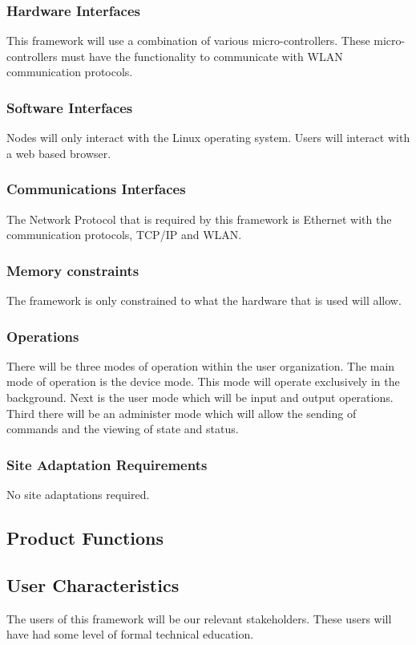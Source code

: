 \documentclass[draftclsnofoot, onecolumn, compsoc, 10pt]{IEEEtran}
\begin{document}
\subsubsection{Hardware Interfaces}
This framework will use a combination of various micro-controllers. These micro-controllers must have the functionality to communicate with WLAN communication protocols.

\subsubsection{Software Interfaces}
Nodes will only interact with the Linux operating system. Users will interact with a web based browser.

\subsubsection{Communications Interfaces}
The Network Protocol that is required by this framework is Ethernet with the communication protocols, TCP/IP and WLAN.

\subsubsection{Memory constraints}
The framework is only constrained to what the hardware that is used will allow.
 
\subsubsection{Operations}
There will be three modes of operation within the user organization. The main mode of operation is the device mode. This mode will operate exclusively in the background. Next is the user mode which will be input and output operations. Third there will be an administer mode which will allow the sending of commands and the viewing of state and status.

\subsubsection{Site Adaptation Requirements}
No site adaptations required.


\subsection{Product Functions}


\subsection{User Characteristics} 
The users of this framework will be our relevant stakeholders. These users will have had some level of formal technical education.
\end{document}
